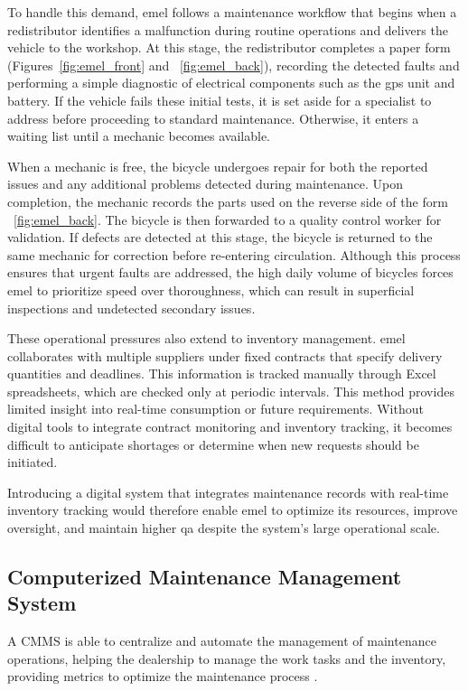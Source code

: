 To handle this demand, \acs{emel} follows a maintenance workflow that begins when a redistributor identifies a malfunction during routine operations and delivers the vehicle to the workshop. At this stage, the redistributor completes a paper form (Figures~\ref{fig:emel_front} and ~\ref{fig:emel_back}), recording the detected faults and performing a simple diagnostic of electrical components such as the \acs{gps} unit and battery. If the vehicle fails these initial tests, it is set aside for a specialist to address before proceeding to standard maintenance. Otherwise, it enters a waiting list until a mechanic becomes available.

When a mechanic is free, the bicycle undergoes repair for both the reported issues and any additional problems detected during maintenance. Upon completion, the mechanic records the parts used on the reverse side of the form ~\ref{fig:emel_back}. The bicycle is then forwarded to a quality control worker for validation. If defects are detected at this stage, the bicycle is returned to the same mechanic for correction before re-entering circulation. Although this process ensures that urgent faults are addressed, the high daily volume of bicycles forces \acs{emel} to prioritize speed over thoroughness, which can result in superficial inspections and undetected secondary issues.

These operational pressures also extend to inventory management. \acs{emel} collaborates with multiple suppliers under fixed contracts that specify delivery quantities and deadlines. This information is tracked manually through Excel spreadsheets, which are checked only at periodic intervals. This method provides limited insight into real-time consumption or future requirements. Without digital tools to integrate contract monitoring and inventory tracking, it becomes difficult to anticipate shortages or determine when new requests should be initiated.

Introducing a digital system that integrates maintenance records with real-time inventory tracking would therefore enable \acs{emel} to optimize its resources, improve oversight, and maintain higher \acs{qa} despite the system's large operational scale.


\subsection{Computerized Maintenance Management System}

A \ac{CMMS} is able to centralize and automate the management of maintenance operations, helping the dealership to manage the work tasks and the inventory, providing metrics to optimize the maintenance process \cite{CMMS_2020, Ibm_2025a, Besiktepe_2020}.

